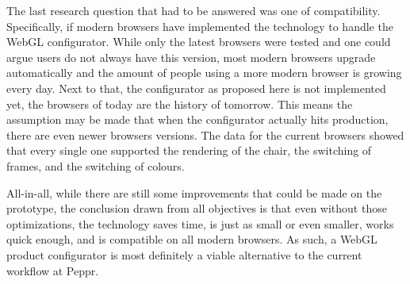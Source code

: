 The last research question that had to be answered was one of compatibility. Specifically, if modern browsers have implemented the technology to handle the WebGL configurator. While only the latest browsers were tested and one could argue users do not always have this version, most modern browsers upgrade automatically and the amount of people using a more modern browser is growing every day. Next to that, the configurator as proposed here is not implemented yet, the browsers of today are the history of tomorrow. This means the assumption may be made that when the configurator actually hits production, there are even newer browsers versions. The data for the current browsers showed that every single one supported the rendering of the chair, the switching of frames, and the switching of colours.\newline

All-in-all, while there are still some improvements that could be made on the prototype, the conclusion drawn from all objectives is that even without those optimizations, the technology saves time, is just as small or even smaller, works quick enough, and is compatible on all modern browsers. As such, a WebGL product configurator is most definitely a viable alternative to the current workflow at Peppr.